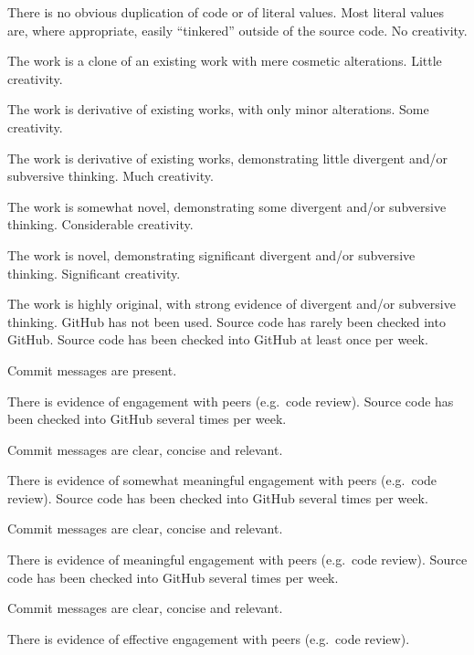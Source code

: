 \documentclass{../fal_assignment}
\begin{document}
\begin{markingrubric}
             \par There is no obvious duplication of code or of literal values. Most literal values are, where appropriate, easily ``tinkered'' outside of the source code.  
%
        \grade\fail No creativity.
            \par The work is a clone of an existing work with mere cosmetic alterations.
        \grade Little creativity.
            \par The work is derivative of existing works, with only minor alterations.
        \grade Some creativity.
            \par The work is derivative of existing works, demonstrating little divergent and/or subversive thinking.
        \grade Much creativity.
            \par The work is somewhat novel, demonstrating some divergent and/or subversive thinking.
        \grade Considerable creativity.
            \par The work is novel, demonstrating significant divergent and/or subversive thinking.
        \grade Significant creativity.
            \par The work is highly original, with strong evidence of divergent and/or subversive thinking.
%
        \grade\fail GitHub has not been used.
        \grade Source code has rarely been checked into GitHub.
        \grade Source code  has been checked into GitHub at least once per week.
            \par Commit messages are present.
            \par There is evidence of engagement with peers (e.g.\ code review).
        \grade Source code  has been checked into GitHub several times per week.
            \par Commit messages are clear, concise and relevant.
            \par There is evidence of somewhat meaningful engagement with peers (e.g.\ code review).
        \grade Source code has been checked into GitHub several times per week.
            \par Commit messages are clear, concise and relevant.
            \par There is evidence of meaningful engagement with peers (e.g.\ code review).
        \grade Source code has been checked into GitHub several times per week.
            \par Commit messages are clear, concise and relevant.
            \par There is evidence of effective engagement with peers (e.g.\ code review).

\end{markingrubric}
\end{document}
